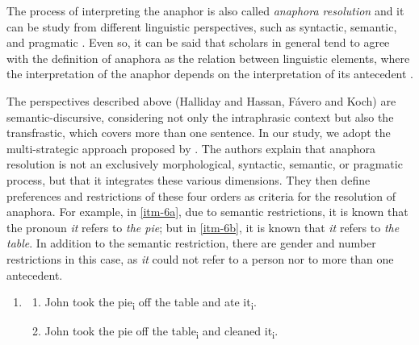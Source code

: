 \documentclass{textolivre}
\begin{document}
The process of interpreting the anaphor is also called \emph{anaphora
resolution} \cite{hirst_anaphora_1981,mcdonald_time_1995,mitkov_oxford_2005} 
and it can be study from different linguistic perspectives, such as
syntactic, semantic, and pragmatic \cite{ariel_interpreting_1994,arnold_effect_2001,grosz_centering:_1995,rahman_coreference_2011}.
Even so, it can be said 
that scholars in general tend to agree with the definition of anaphora
as the relation between linguistic elements, where the interpretation of
the anaphor depends on the interpretation of its antecedent \cite[p.~1]{huang_anaphora:_2000}.

The perspectives described above (Halliday and Hassan, Fávero and Koch)
are semantic-discursive, considering not only the intraphrasic context
but also the transfrastic, which covers more than one sentence. In our
study, we adopt the multi-strategic approach proposed by \textcite{carbonell_anaphora_1988}.
The authors explain that anaphora resolution is not an
exclusively morphological, syntactic, semantic, or pragmatic process,
but that it integrates these various dimensions. They then define
preferences and restrictions of these four orders as criteria for the
resolution of anaphora. For example, in \ref{itm-6a}, due to semantic
restrictions, it is known that the pronoun \emph{it} refers to \emph{the
pie}; but in \ref{itm-6b}, it is known that \emph{it} refers to \emph{the
table}. In addition to the semantic restriction, there are gender and
number restrictions in this case, as \emph{it} could not refer to a
person nor to more than one antecedent.

%
%
\begin{enumerate}[wide,label=(\arabic*),topsep=1ex,partopsep=1ex,noitemsep,leftmargin=0.15cm,resume]
\setlength{\itemindent}{0em}
\item[]{} \addtocounter{enumi}{1} 
\begin{enumerate}[wide,label=(\arabic{enumi}\alph*),topsep=1ex,partopsep=1ex,noitemsep]
\setlength{\itemindent}{0em}
\item \label{itm-6a} John took the pie\textsubscript{i} off the table and ate it\textsubscript{i}.
\item \label{itm-6b} John took the pie off the table\textsubscript{i} and cleaned it\textsubscript{i}.
\end{enumerate}
\end{enumerate}
\end{document}
